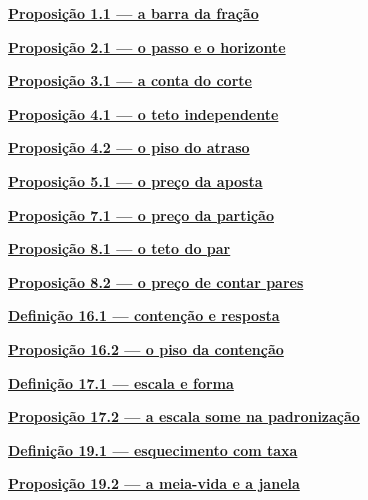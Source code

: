 
\noindent\hyperref[prop:barra]{\textbf{Proposição 1.1 --- a barra da fração}}\dotfill\ \pageref{prop:barra}\par
\noindent\hyperref[prop:passo]{\textbf{Proposição 2.1 --- o passo e o horizonte}}\dotfill\ \pageref{prop:passo}\par
\noindent\hyperref[prop:conta]{\textbf{Proposição 3.1 --- a conta do corte}}\dotfill\ \pageref{prop:conta}\par
\noindent\hyperref[prop:teto]{\textbf{Proposição 4.1 --- o teto independente}}\dotfill\ \pageref{prop:teto}\par
\noindent\hyperref[prop:piso]{\textbf{Proposição 4.2 --- o piso do atraso}}\dotfill\ \pageref{prop:piso}\par
\noindent\hyperref[prop:aposta]{\textbf{Proposição 5.1 --- o preço da aposta}}\dotfill\ \pageref{prop:aposta}\par
\noindent\hyperref[prop:particao]{\textbf{Proposição 7.1 --- o preço da partição}}\dotfill\ \pageref{prop:particao}\par
\noindent\hyperref[prop:teto-do-par]{\textbf{Proposição 8.1 --- o teto do par}}\dotfill\ \pageref{prop:teto-do-par}\par
\noindent\hyperref[prop:preco-dos-pares]{\textbf{Proposição 8.2 --- o preço de contar pares}}\dotfill\ \pageref{prop:preco-dos-pares}\par
\noindent\hyperref[def:resposta]{\textbf{Definição 16.1 --- contenção e resposta}}\dotfill\ \pageref{def:resposta}\par
\noindent\hyperref[prop:piso-contencao]{\textbf{Proposição 16.2 --- o piso da contenção}}\dotfill\ \pageref{prop:piso-contencao}\par
\noindent\hyperref[def:escala-forma]{\textbf{Definição 17.1 --- escala e forma}}\dotfill\ \pageref{def:escala-forma}\par
\noindent\hyperref[prop:padronizacao]{\textbf{Proposição 17.2 --- a escala some na padronização}}\dotfill\ \pageref{prop:padronizacao}\par
\noindent\hyperref[def:esquecimento]{\textbf{Definição 19.1 --- esquecimento com taxa}}\dotfill\ \pageref{def:esquecimento}\par
\noindent\hyperref[prop:meia-vida]{\textbf{Proposição 19.2 --- a meia-vida e a janela}}\dotfill\ \pageref{prop:meia-vida}\par
